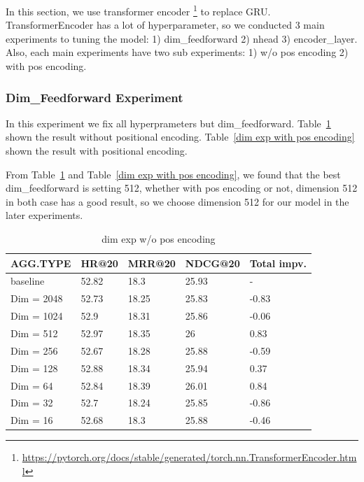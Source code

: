 \documentclass{article}
\begin{document}
In this section, we use transformer encoder
\footnote{\url{https://pytorch.org/docs/stable/generated/torch.nn.TransformerEncoder.html}}
to replace GRU.
TransformerEncoder has a lot of hyperparameter, so we conducted
3 main experiments to tuning the model:
1) dim\_feedforward 2) nhead 3) encoder\_layer.
Also, each main experiments have two sub experiments:
1) w/o pos encoding 2) with pos encoding.

\subsubsection{Dim\_Feedforward Experiment}

In this experiment we fix all hyperprameters but dim\_feedforward.
Table~\ref{dim exp w/o pos encoding} shown the result without
positional encoding.
Table~\ref{dim exp with pos encoding} shown the result with positional encoding.

From Table~\ref{dim exp w/o pos encoding} and Table~\ref{dim exp with pos encoding},
we found that the best dim\_feedforward is setting 512,
whether with pos encoding or not, dimension 512 in both case has a good result,
so we choose dimension 512 for our model in the later experiments.

\begin{table}
    \caption{dim exp w/o pos encoding}
    \label{dim exp w/o pos encoding}
    \centering
    \begin{tabular}{lllll}
        \toprule
        AGG.TYPE   & HR@20 & MRR@20 & NDCG@20 & Total impv. \\
        \midrule
        baseline   & 52.82 & 18.3   & 25.93   & -           \\
        Dim = 2048 & 52.73 & 18.25  & 25.83   & -0.83       \\
        Dim = 1024 & 52.9  & 18.31  & 25.86   & -0.06       \\
        Dim = 512  & 52.97 & 18.35  & 26      & 0.83        \\
        Dim = 256  & 52.67 & 18.28  & 25.88   & -0.59       \\
        Dim = 128  & 52.88 & 18.34  & 25.94   & 0.37        \\
        Dim = 64   & 52.84 & 18.39  & 26.01   & 0.84        \\
        Dim = 32   & 52.7  & 18.24  & 25.85   & -0.86       \\
        Dim = 16   & 52.68 & 18.3   & 25.88   & -0.46       \\
        \bottomrule
    \end{tabular}
\end{table}
\end{document}
